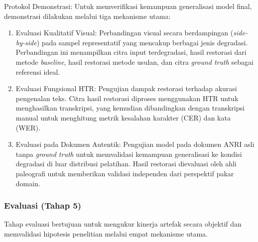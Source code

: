 \documentclass[12pt,a4paper]{article}
\begin{document}
Protokol Demonstrasi: Untuk memverifikasi kemampuan generalisasi model final, demonstrasi dilakukan melalui tiga mekanisme utama:
\begin{enumerate}[label=(\arabic*), nosep]
    \item Evaluasi Kualitatif Visual: Perbandingan visual secara berdampingan (\textit{side-by-side}) pada sampel representatif yang mencakup berbagai jenis degradasi. Perbandingan ini menampilkan citra input terdegradasi, hasil restorasi dari metode \textit{baseline}, hasil restorasi metode usulan, dan citra \textit{ground truth} sebagai referensi ideal.
    \item Evaluasi Fungsional HTR: Pengujian dampak restorasi terhadap akurasi pengenalan teks. Citra hasil restorasi diproses menggunakan HTR untuk menghasilkan transkripsi, yang kemudian dibandingkan dengan transkripsi manual untuk menghitung metrik kesalahan karakter (CER) dan kata (WER).
    \item Evaluasi pada Dokumen Autentik: Pengujian model pada dokumen ANRI asli tanpa \textit{ground truth} untuk memvalidasi kemampuan generalisasi ke kondisi degradasi di luar distribusi pelatihan. Hasil restorasi dievaluasi oleh ahli paleografi untuk memberikan validasi independen dari perspektif pakar domain.
\end{enumerate}

\subsubsection{Evaluasi (Tahap 5)}
Tahap evaluasi bertujuan untuk mengukur kinerja artefak secara objektif dan memvalidasi hipotesis penelitian melalui empat mekanisme utama.
\end{document}
